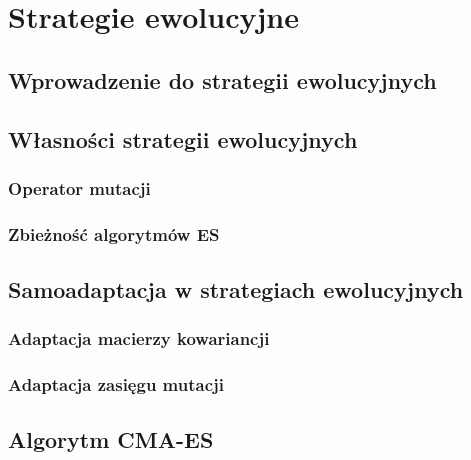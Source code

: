 \newpage

\section{Strategie ewolucyjne}
\subsection{Wprowadzenie do strategii ewolucyjnych}
\subsection{Własności strategii ewolucyjnych}
\subsubsection{Operator mutacji}
\subsubsection{Zbieżność algorytmów ES}
\subsection{Samoadaptacja w strategiach ewolucyjnych}
\subsubsection{Adaptacja macierzy kowariancji}
\subsubsection{Adaptacja zasięgu mutacji}
\subsection{Algorytm CMA-ES}